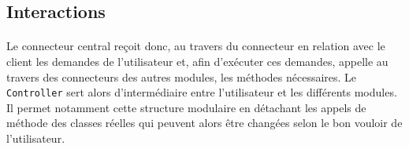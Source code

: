 \subsection{Interactions}
\paragraph{}
Le connecteur central reçoit donc, au travers du connecteur en relation avec le client les demandes de l'utilisateur et, afin d'exécuter ces demandes, appelle au travers des connecteurs des autres modules, les méthodes nécessaires. Le \texttt{Controller} sert alors d'intermédiaire entre l'utilisateur et les différents modules. Il permet notamment cette structure modulaire en détachant les appels de méthode des classes réelles qui peuvent alors être changées selon le bon vouloir de l'utilisateur.
